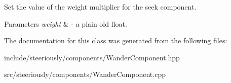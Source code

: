 Set the value of the weight multiplier for the seek component. 


\begin{DoxyParams}{Parameters}
{\em weight} & -\/ a plain old float. \\
\hline
\end{DoxyParams}


The documentation for this class was generated from the following files\-:\begin{DoxyCompactItemize}
\item 
include/steeriously/components/Wander\-Component.\-hpp\item 
src/steeriously/components/Wander\-Component.\-cpp\end{DoxyCompactItemize}
